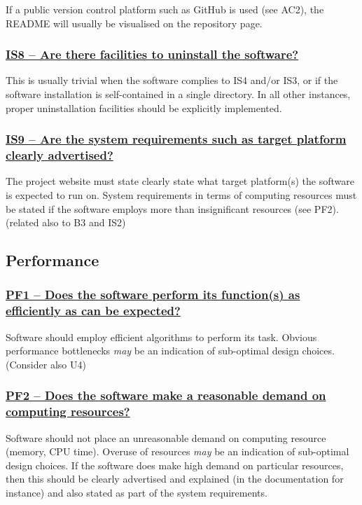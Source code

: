 \documentclass[a4paper,11pt]{article}
\newcommand{\indicator}[1]{\subsubsection*{\underline{#1}}}
\begin{document}
If a public version control platform such as GitHub is used (see AC2), the
README will usually be visualised on the repository page.

\indicator{IS8 -- Are there facilities to uninstall the software?}

This is usually trivial when the software complies to IS4 and/or IS3, or if the
software installation is self-contained in a single directory. In all other
instances, proper uninstallation facilities should be explicitly implemented.

\indicator{IS9 -- Are the system requirements such as target platform clearly advertised?}

The project website must state clearly state what target platform(s) the software is expected to run on.
System requirements in terms of computing resources must be stated if the software employs more than insignificant resources (see PF2).
(related also to B3 and IS2)

\subsection{Performance}

\indicator{PF1 -- Does the software perform its function(s) as efficiently as can be expected?}

Software should employ efficient algorithms to perform its task. Obvious performance bottlenecks \emph{may} be an indication of sub-optimal design choices.
%
%
%
(Consider also U4)

\indicator{PF2 -- Does the software make a reasonable demand on computing resources?}

Software should not place an unreasonable demand on computing resource (memory,
CPU time). Overuse of resources \emph{may} be an indication of sub-optimal
design choices.  If the software does make high demand on particular resources,
then this should be clearly advertised and explained (in the documentation for
instance) and also stated as part of the system requirements.
\end{document}
